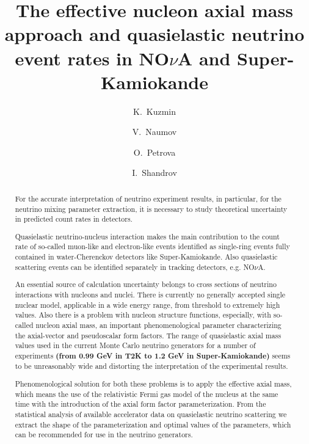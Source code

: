 \documentclass[preprint]{elsarticle}
\begin{document}
\begin{frontmatter}

\title{The effective nucleon axial mass approach and quasielastic neutrino event rates in NO$\nu$A and Super-Kamiokande}

\author[ITEP,JINR]{K.~Kuzmin}

\author[JINR]{V.~Naumov}

\author[JINR]{O.~Petrova}

\author[JINR]{I.~Shandrov}

\address[ITEP]{Institute for Theoretical and Experimental Physics, Bolshaya Cheremushkinskaya 25, RU-117218 Moscow, Russia}
\address[JINR]{Joint Institute for Nuclear Research, Joliot-Curie 6, RU-141980 Dubna, Russia}

\begin{abstract}
For the accurate interpretation of neutrino experiment results, in particular, for the neutrino mixing parameter extraction, it is necessary to study theoretical uncertainty in predicted count rates in detectors.

Quasielastic neutrino-nucleus interaction makes the main contribution to the count rate of so-called muon-like and electron-like events identified as single-ring events fully contained in water-Cherenckov detectors like Super-Kamiokande. Also quasielastic scattering events can be identified separately in tracking detectors, e.g. NO$\nu$A.

An essential source of calculation uncertainty belongs to cross sections of neutrino interactions with nucleons and nuclei. There is currently no generally accepted single nuclear model, applicable in a wide energy range, from threshold to extremely high values. Also there is a problem with nucleon structure functions, especially, with so-called nucleon axial mass, an important phenomenological parameter characterizing the axial-vector and pseudoscalar form factors. The range of quasielastic axial mass values used in the current Monte Carlo neutrino generators for a number of experiments \textbf{(from 0.99 GeV in T2K to 1.2 GeV in Super-Kamiokande)} seems to be unreasonably wide and distorting the interpretation of the experimental results.

Phenomenological solution for both these problems is to apply the effective axial mass, which means the use of the relativistic Fermi gas model of the nucleus at the same time with the introduction of the axial form factor parameterization. From the statistical analysis of available accelerator data on quasielastic neutrino scattering we extract the shape of the parameterization and optimal values of the parameters, which can be recommended for use in the neutrino generators.


\end{abstract}
\end{frontmatter}
\end{document}
